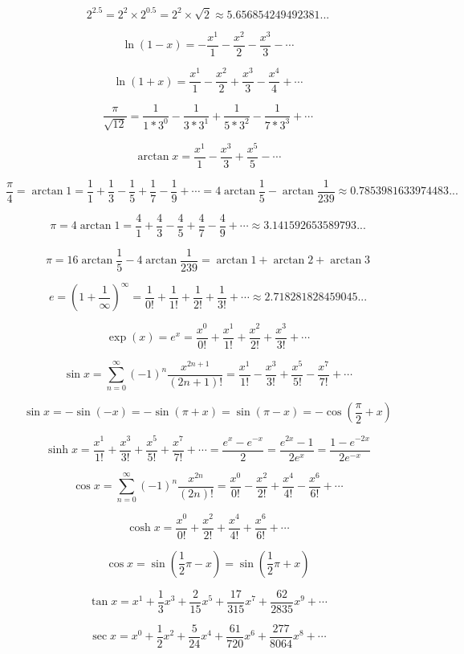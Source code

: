 \documentclass{article}
\begin{document}
\[2^{2.5} = 2^2 \times 2^{0.5} = 2^2 \times \sqrt{2} \approx 5.656854249492381...\]

\[\ln(1-x) = -\frac{x^1}{1} - \frac{x^2}{2} - \frac{x^3}{3} - \cdots\]

\[\ln(1+x) = \frac{x^1}{1} - \frac{x^2}{2} + \frac{x^3}{3} - \frac{x^4}{4} + \cdots\]

\[\frac{\pi}{\sqrt{12}} =
\frac{1}{1*3^0} - \frac{1}{3*3^1} + \frac{1}{5*3^2} - \frac{1}{7*3^3} + \cdots\]

\[\arctan x = \frac{x^1}{1} - \frac{x^3}{3} + \frac{x^5}{5} - \cdots\]

\[\frac{\pi}{4} = \arctan1 =
\frac{1}{1} + \frac{1}{3} - \frac{1}{5} + \frac{1}{7} - \frac{1}{9} + \cdots =
4\arctan{\frac{1}{5}} - \arctan{\frac{1}{239}} \approx 0.7853981633974483...\]

\[\pi = 4\arctan1 = \frac{4}{1} + \frac{4}{3} - \frac{4}{5} + \frac{4}{7} - \frac{4}{9} + \cdots
\approx 3.141592653589793...\]

\[\pi = 16\arctan{\frac{1}{5}} - 4\arctan{\frac{1}{239}} = \arctan1 + \arctan2 + \arctan3\]

\[e = (1 + \frac{1}{\infty})^{\infty} =
\frac{1}{0!} + \frac{1}{1!} + \frac{1}{2!} + \frac{1}{3!} + \cdots \approx 2.718281828459045...\]

\[\exp(x) = e^x = \frac{x^0}{0!} + \frac{x^1}{1!} + \frac{x^2}{2!} + \frac{x^3}{3!} + \cdots\]

\[\sin x = \sum_{n=0}^{\infty}(-1)^n\frac{x^{2n+1}}{(2n+1)!} =
\frac{x^1}{1!} - \frac{x^3}{3!} + \frac{x^5}{5!} - \frac{x^7}{7!} + \cdots\]

\[\sin x = -\sin(-x) = -\sin(\pi + x) = \sin(\pi - x) = -\cos(\frac{\pi}{2} + x)\]

\[\sinh x = \frac{x^1}{1!} + \frac{x^3}{3!} + \frac{x^5}{5!} + \frac{x^7}{7!} + \cdots =
\frac{e^x - e^{-x}}{2} = \frac{e^{2x} - 1}{2e^x} = \frac{1 - e^{-2x}}{2e^{-x}}\]

\[\cos x = \sum_{n=0}^{\infty}(-1)^n\frac{x^{2n}}{(2n)!} =
\frac{x^0}{0!} - \frac{x^2}{2!} + \frac{x^4}{4!} - \frac{x^6}{6!} + \cdots\]

\[\cosh x = \frac{x^0}{0!} + \frac{x^2}{2!} + \frac{x^4}{4!} + \frac{x^6}{6!} + \cdots\]

\[\cos x = \sin(\frac{1}{2}\pi - x) = \sin(\frac{1}{2}\pi + x)\]

\[\tan x = x^1 + \frac{1}{3}x^3 + \frac{2}{15}x^5 +
\frac{17}{315}x^7 + \frac{62}{2835}x^9 + \cdots\]

\[\sec x = x^0 + \frac{1}{2}x^2 + \frac{5}{24}x^4 + \frac{61}{720}x^6 +
\frac{277}{8064}x^8 + \cdots\]
\end{document}

